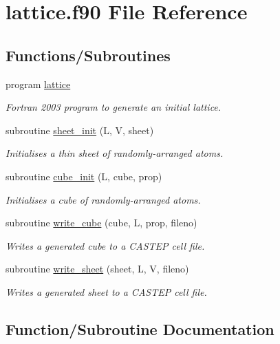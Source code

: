 \hypertarget{lattice_8f90}{}\section{lattice.\+f90 File Reference}
\label{lattice_8f90}
\subsection*{Functions/\+Subroutines}
\begin{DoxyCompactItemize}
\item 
program \hyperlink{lattice_8f90_a074b800ff517e34c79a2dbc1c126c053}{lattice}
\begin{DoxyCompactList}\small\item\em Fortran 2003 program to generate an initial lattice. \end{DoxyCompactList}\item 
subroutine \hyperlink{lattice_8f90_a79ad1c06a2b1d40c67a129d5e5eb1a34}{sheet\+\_\+init} (L, V, sheet)
\begin{DoxyCompactList}\small\item\em Initialises a thin sheet of randomly-\/arranged atoms. \end{DoxyCompactList}\item 
subroutine \hyperlink{lattice_8f90_af7097236827ac4e2d8517ef9e5977dbf}{cube\+\_\+init} (L, cube, prop)
\begin{DoxyCompactList}\small\item\em Initialises a cube of randomly-\/arranged atoms. \end{DoxyCompactList}\item 
subroutine \hyperlink{lattice_8f90_a4e9addf4e0a1a8031ff3cae9ef023ac6}{write\+\_\+cube} (cube, L, prop, fileno)
\begin{DoxyCompactList}\small\item\em Writes a generated cube to a C\+A\+S\+T\+EP cell file. \end{DoxyCompactList}\item 
subroutine \hyperlink{lattice_8f90_a31f431c955e9314f85387edc05e3f005}{write\+\_\+sheet} (sheet, L, V, fileno)
\begin{DoxyCompactList}\small\item\em Writes a generated sheet to a C\+A\+S\+T\+EP cell file. \end{DoxyCompactList}\end{DoxyCompactItemize}


\subsection{Function/\+Subroutine Documentation}
